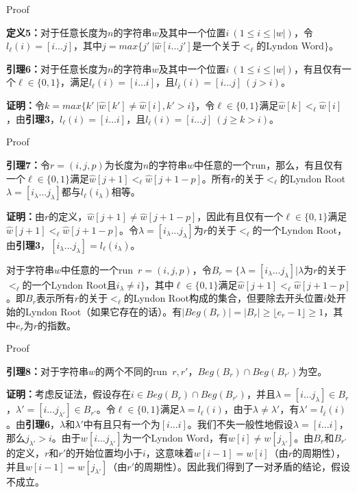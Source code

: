 \documentclass{beamer}
\begin{document}
\begin{frame}{Proof}
    \par \textbf{定义5：}对于任意长度为$n$的字符串$w$及其中一个位置$i\ (1\leq i\leq|w|)$，令$l_{\ell}(i)=[i...j]$，其中$j=max\{j'\ |\hat{w}[i...j']$是一个关于$<_{\ell}$的Lyndon Word$\}$。
	\pause
    \par \textbf{引理6：}对于任意长度为$n$的字符串$w$及其中一个位置$i\ (1\leq i\leq|w|)$，有且仅有一个$\ell\in\{0,1\}$，满足$l_{\ell}(i)=[i...i]$，且$l_{\bar{\ell}}(i)=[i...j]\ (j>i)$。
	\pause
    \par \textbf{证明：}令$k=max\{k'\ |\hat{w}[k']\ne \hat{w}[i],k'>i\}$，令$\ell\in\{0,1\}$满足$\hat{w}[k]<_{\ell}\hat{w}[i]$，由\textbf{引理3}，$l_{\ell}(i)=[i...i]$，且$l_{\bar{\ell}}(i)=[i...j]\ (j\geq k>i)$。
\end{frame}

\begin{frame}{Proof}
	\par \textbf{引理7：}令$r=(i,j,p)$为长度为$n$的字符串$w$中任意的一个run，那么，有且仅有一个$\ell\in\{0,1\}$满足$\hat{w}[j+1]<_{\ell}\hat{w}[j+1-p]$。所有$r$的关于$<_{\ell}$的Lyndon Root\ $\lambda=[i_{\lambda}...j_{\lambda}]$都与$l_{\ell}(i_{\lambda})$相等。
	\pause
    \par \textbf{证明：}由$r$的定义，$\hat{w}[j+1]\ne\hat{w}[j+1-p]$，因此有且仅有一个$\ell\in\{0,1\}$满足$\hat{w}[j+1]<_{\ell}\hat{w}[j+1-p]$。令$\lambda=[i_{\lambda}...j_{\lambda}]$为$r$的关于$<_{\ell}$的一个Lyndon Root，由\textbf{引理3}，$[i_{\lambda}...j_{\lambda}]=l_{\ell}(i_{\lambda})$。
	\pause
    \par 对于字符串$w$中任意的一个run\ $r=(i,j,p)$，令$B_r=\{\lambda=[i_{\lambda}...j_{\lambda}]|\lambda$为$r$的关于$<_{\ell}$的一个Lyndon Root且$i_{\lambda}\ne i\}$，其中$\ell\in\{0,1\}$满足$\hat{w}[j+1]<_{\ell}\hat{w}[j+1-p]$。即$B_r$表示所有$r$的关于$<_{\ell}$的Lyndon Root构成的集合，但要除去开头位置$i$处开始的Lyndon Root（如果它存在的话）。有$|Beg(B_r)|=|B_r|\geq \lfloor e_r-1\rfloor\geq 1$，其中$e_r$为$r$的指数。
\end{frame}

\begin{frame}{Proof}
    \par \textbf{引理8：}对于字符串$w$的两个不同的run\ $r,r'$，$Beg(B_r)\cap Beg(B_{r'})$为空。
	\pause
    \par \textbf{证明：}考虑反证法，假设存在$i\in Beg(B_r)\cap Beg(B_{r'})$，并且$\lambda=[i...j_{\lambda}]\in B_r$，$\lambda'=[i...j_{\lambda'}]\in B_{r'}$。令$\ell\in\{0,1\}$满足$\lambda=l_{\ell}(i)$，由于$\lambda\ne \lambda'$，有$\lambda'=l_{\bar{\ell}}(i)$。由\textbf{引理6}，$\lambda$和$\lambda'$中有且只有一个为$[i...i]$。我们不失一般性地假设$\lambda=[i...i]$，那么$j_{\lambda'}>i$。由于$w[i...j_{\lambda'}]$为一个Lyndon Word，有$w[i]\ne w[j_{\lambda'}]$。由$B_r$和$B_{r'}$的定义，$r$和$r'$的开始位置均小于$i$，这意味着$w[i-1]=w[i]$（由$r$的周期性），并且$w[i-1]=w[j_{\lambda'}]$（由$r'$的周期性）。因此我们得到了一对矛盾的结论，假设不成立。
\end{frame}
\end{document}
